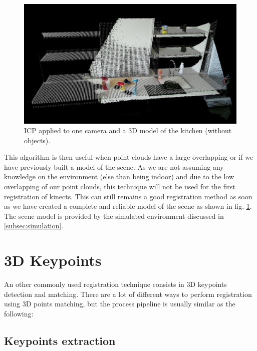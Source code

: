 \begin{figure}[h!]
    \centering
    \includegraphics[width=\textwidth]{images/icp_model.png}
    \caption{ICP applied to one camera and a 3D model of the kitchen (without objects).}
    \label{fig:icp_model}
\end{figure}

This algorithm is then useful when point clouds have a large overlapping or if we have previously built a model of the scene. As we are not assuming any knowledge on the environment (else than being indoor) and due to the low overlapping of our point clouds, this technique will not be used for the first registration of kinects. This can still remains a good registration method as soon as we have created a complete and reliable model of the scene as shown in fig. \ref{fig:icp_model}. The scene model is provided by the simulated environment discussed in \ref{subsec:simulation}.

\section{3D Keypoints} \label{sec:3dkp}

An other commonly used registration technique consists in 3D keypoints detection and matching. 
There are a lot of different ways to perform registration using 3D points matching, but the process pipeline is usually similar as the following:

\subsection{Keypoints extraction}

